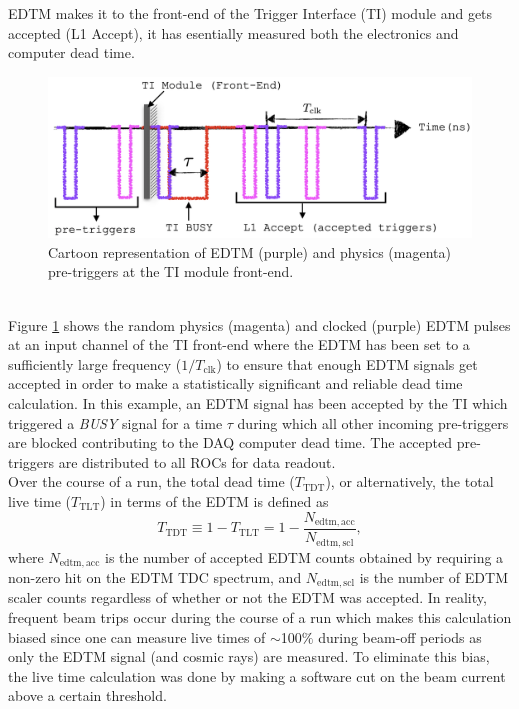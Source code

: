 \documentclass[11pt]{article}
\begin{document}
EDTM makes it to the front-end of the Trigger Interface (TI) module and gets accepted (L1 Accept), it has esentially measured both the electronics and computer dead time.\\
\begin{figure}[H]
  \centering
  \includegraphics[scale=0.40]{EDTM_TI.png}
  \caption{Cartoon representation of EDTM (purple) and physics (magenta) pre-triggers at the TI module front-end.}
  \label{fig:EDTM_TI}
\end{figure}\\
\indent Figure \ref{fig:EDTM_TI} shows the random physics (magenta) and clocked (purple) EDTM pulses at an input channel of the TI front-end where the EDTM has
been set to a sufficiently large frequency ($1/T_{\mathrm{clk}}$) to ensure that enough EDTM signals get accepted in order to make a statistically significant and
reliable dead time calculation. In this example, an EDTM signal has been accepted by the TI which triggered a \textit{BUSY} signal for a time $\tau$ during which all other incoming pre-triggers are blocked
contributing to the DAQ computer dead time. The accepted pre-triggers are distributed to all ROCs for data readout. \\
\indent Over the course of a run, the total dead time ($T_{\mathrm{TDT}}$), or alternatively, the total live time ($T_{\mathrm{TLT}}$) in terms of the EDTM is defined as
\begin{equation}
 T_{\mathrm{TDT}} \equiv 1 - T_{\mathrm{TLT}} = 1 - \frac{N_{\mathrm{edtm,acc}}}{N_{\mathrm{edtm,scl}}},
  \label{eq:3.24}
\end{equation}
where $N_{\mathrm{edtm,acc}}$ is the number of accepted EDTM counts obtained by requiring a non-zero hit on the EDTM TDC spectrum, and $N_{\mathrm{edtm,scl}}$ is the number of EDTM scaler counts regardless of whether or not
the EDTM was accepted. In reality, frequent beam trips occur during the course of a run which makes this calculation biased since one can measure live times of $\sim$100$\%$ during beam-off periods as only
the EDTM signal (and cosmic rays) are measured. To eliminate this bias, the live time calculation was done by making a software cut on the beam current above a certain threshold.
\end{document}
